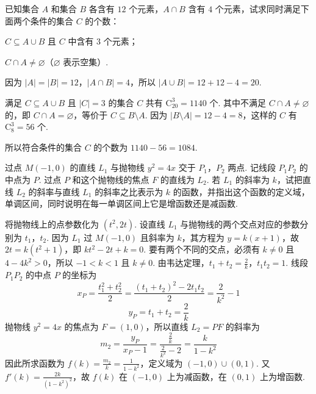 \documentclass[UTF8,a4paper,oneside,11pt]{ctexbook}
\begin{document}
\begin{problem}

已知集合 \(A\) 和集合 \(B\) 各含有 \(12\) 个元素，\(A \cap B\) 含有 \(4\) 个元素，试求同时满足下面两个条件的集合 \(C\) 的个数：

\begin{circlelist}
\item \(C \subseteq A \cup B\) 且 \(C\) 中含有 \(3\) 个元素；
\item \(C \cap A \neq \varnothing\)（\(\varnothing\) 表示空集）.
\end{circlelist}
\end{problem}

\begin{solution}
因为 \(\lvert A\rvert=\lvert B\rvert=12\)，\(\lvert A\cap B\rvert=4\)，所以 \(\lvert A\cup B\rvert=12+12-4=20\).

满足 \(C\subseteq A\cup B\) 且 \(\lvert C\rvert=3\) 的集合 \(C\) 共有 \(\mathrm C_{20}^{3}=1140\) 个. 其中不满足 \(C\cap A\neq\varnothing\) 的，即 \(C\cap A=\varnothing\)，等价于 \(C\subseteq B\setminus A\). 因为 \(\lvert B\setminus A\rvert=12-4=8\)，这样的 \(C\) 有 \(\mathrm C_{8}^{3}=56\) 个.

所以符合条件的集合 \(C\) 的个数为 \(1140-56=1084\).
\end{solution}

\begin{problem}

过点 \(M(-1,0)\) 的直线 \(L_1\) 与抛物线 \(y^2 = 4x\) 交于 \(P_1\)，\(P_2\) 两点. 记线段 \(P_1P_2\) 的中点为 \(P\). 过点 \(P\) 和这个抛物线的焦点 \(F\) 的直线为 \(L_2\). 若 \(L_1\) 的斜率为 \(k\)，试把直线 \(L_2\) 的斜率与直线 \(L_1\) 的斜率之比表示为 \(k\) 的函数，并指出这个函数的定义域，单调区间，同时说明在每一单调区间上它是增函数还是减函数.
\end{problem}

\begin{solution}
将抛物线上的点参数化为 \((t^2,2t)\). 设直线 \(L_1\) 与抛物线的两个交点对应的参数分别为 \(t_1\)，\(t_2\). 因为 \(L_1\) 过 \(M(-1,0)\) 且斜率为 \(k\)，其方程为 \(y=k(x+1)\)，故
\(2t=k(t^2+1)\)，即 \(kt^2-2t+k=0\).
要有两个不同的交点，必须有 \(k\neq0\) 且 \(4-4k^2>0\)，所以 \(-1<k<1\) 且 \(k\neq0\). 由韦达定理，\(t_1+t_2=\frac{2}{k}\)，\(t_1t_2=1\). 线段 \(P_1P_2\) 的中点 \(P\) 的坐标为
\[
x_P=\frac{t_1^2+t_2^2}{2}=\frac{(t_1+t_2)^2-2t_1t_2}{2}=\frac{2}{k^2}-1
\]
\[
y_P=t_1+t_2=\frac{2}{k}
\]
抛物线 \(y^2=4x\) 的焦点为 \(F=(1,0)\)，所以直线 \(L_2=PF\) 的斜率为
\[
m_2=\frac{y_P}{x_P-1}=\frac{\frac{2}{k}}{\frac{2}{k^2}-2}=\frac{k}{1-k^2}
\]
因此所求函数为 \(f(k)=\frac{m_2}{k}=\frac{1}{1-k^2}\)，定义域为 \((-1,0)\cup(0,1)\). 又
\(f'(k)=\frac{2k}{(1-k^2)^2}\)，故 \(f(k)\) 在 \((-1,0)\) 上为减函数，在 \((0,1)\) 上为增函数.
\end{solution}
\end{document}
